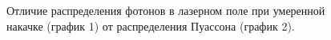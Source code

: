 \begin{figure}
\centering



\caption{Отличие распределения фотонов в лазерном поле при умеренной
  накачке (график 1) от распределения Пуассона (график 2).}
\label{figPart2Ch1_5}
\end{figure}
